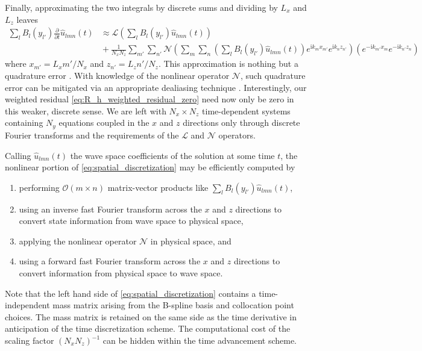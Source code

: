 \documentclass[letterpaper,11pt,nointlimits,reqno,draft]{amsart}
\newcommand{\ii}{\ensuremath{\mathrm{i}}}
\begin{document}
Finally, approximating the two integrals by discrete sums and dividing
by $L_x$ and $L_z$ leaves
\begin{align}
  \sum_{l} B_l\!\left(y_{l'}\right)
  \frac{\partial}{\partial{}t} \hat{u}_{l m n}(t)
  &\approx
  \mathscr{L}\left(
    \sum_{l}
     B_l\!\left(y_{l'}\right)
    \hat{u}_{l m n}(t)
  \right)
\\
  &{}+
  \frac{1}{N_x N_z}
  \sum_{m'} \sum_{n'}
  \mathscr{N}\left(
    \sum_{m}
    \sum_{n}
    \left(
      \sum_{l} B_l\!\left(y_{l'}\right)
      \hat{u}_{l m n}(t)
    \right)
    e^{\ii k_m x_{m'}}e^{\ii k_n z_{n'}}
  \right)
  \!\!
  \left(
    e^{-\ii k_{m'} x_m}e^{-\ii k_{n'} z_n}
  \right)
  \label{eq:spatial_discretization}
\end{align}
where $x_{m'}=L_x m' / N_x$ and $z_{n'}=L_z n' / N_z$.  This approximation is
nothing but a quadrature error \citep[see][theorem~19]{Boyd2001}.  With
knowledge of the nonlinear operator $\mathscr{N}$, such quadrature error can be
mitigated via an appropriate dealiasing technique \citep[see][]{Canuto2006}.
Interestingly, our weighted residual \eqref{eq:R_h_weighted_residual_zero} need
now only be zero in this weaker, discrete sense.  We are left with
$N_x\times{}N_z$ time-dependent systems containing $N_y$ equations coupled in
the $x$ and $z$ directions only through discrete Fourier transforms and the
requirements of the $\mathscr{L}$ and $\mathscr{N}$ operators.

Calling $\hat{u}_{l m n}(t)$ the wave space coefficients of the solution at
some time $t$, the nonlinear portion of \eqref{eq:spatial_discretization} may
be efficiently computed by
\begin{enumerate}
 \item performing $\mathcal{O}\!\left(m\times{}n\right)$ matrix-vector products
       like $\sum_{l} B_l\!\left(y_{l'}\right) \hat{u}_{l m n}(t)$,
 \item using an inverse fast Fourier transform across
       the $x$ and $z$ directions to convert state information from wave space
       to physical space,
 \item applying the nonlinear operator $\mathscr{N}$ in physical space, and
 \item using a forward fast Fourier transform across the $x$ and $z$
       directions to convert information from physical space to wave space.
\end{enumerate}
Note that the left hand side of \eqref{eq:spatial_discretization} contains a
time-independent mass matrix arising from the B-spline basis and collocation
point choices.  The mass matrix is retained on the same side as the time
derivative in anticipation of the time discretization scheme.  The
computational cost of the scaling factor $\left(N_x N_z\right)^{-1}$
can be hidden within the time advancement scheme.
\end{document}
